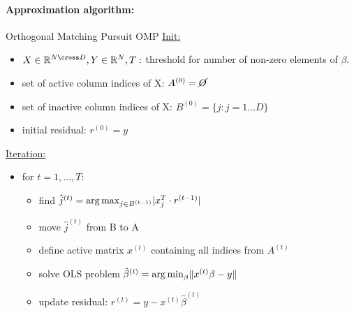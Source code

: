 \documentclass[11pt]{article}
\DeclareMathOperator*{\argmin}{arg\,min}
\DeclareMathOperator*{\argmax}{arg\,max}
\DeclarePairedDelimiter\abs{\lvert}{\rvert}
\DeclarePairedDelimiter\norm{\lVert}{\rVert}
\begin{document}
    \paragraph{Approximation algorithm:} Orthogonal Matching Pursuit OMP
    \underline{Init:}
    \begin{itemize}
      \item $X \in \mathbb{R}^{N\cross D}, Y \in \mathbb{R}^N, T:$ threshold for
      number of non-zero elements of $\beta$.
      \item set of active column indices of X: $A^{(0)} = \cancel{O}$
      \item set of inactive column indices of X: $B^{(0)} = \{ j:j=1...D \}$
      \item initial residual: $r^{(0)}=y$
    \end{itemize}
    \underline{Iteration:}
    \begin{itemize}
      \item for $t=1,...,T:$
      \begin{itemize}
        \item find $\hat{j}^{(t)}=\argmax_{j\in B^{(t-1)}} \abs{x_j^T \cdot r^{(t-1)}}$
        \item move $\hat{j}^{(t)}$ from B to A
        \item define active matrix $x^{(t)}$ containing all indices from $A^{(t)}$
        \item solve OLS problem $\hat{\beta}^{(t)}=\argmin_\beta \norm{x^{(t)}\beta-y}$
        \item update residual: $r^{(t)}=y-x^{(t)}\hat{\beta}^{(t)}$
      \end{itemize}
    \end{itemize}























  
\end{document}
